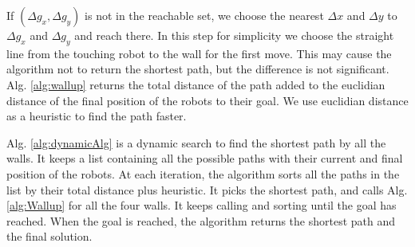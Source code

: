 If  $(\Delta g_x, \Delta g_y)$ is not in the reachable set, we choose the nearest $\Delta x$ and $\Delta y$ to $\Delta g_x$ and $\Delta g_y$ and reach there. In this step for simplicity we choose the straight line from the touching robot to the wall for the first move. This may cause the algorithm not to return the shortest path, but the difference is not significant. 
Alg. \ref{alg:wallup} returns the total distance of the path added to the euclidian distance of the final position of the robots to their goal. We use euclidian distance as a heuristic to find the path faster.

Alg. \ref{alg:dynamicAlg} is a dynamic search to find the shortest path by all the walls. It keeps a list containing all the possible paths with their current and final position of the robots. At each iteration, the algorithm sorts all the paths in the list by their total distance plus heuristic. It picks the shortest path, and calls Alg. \ref{alg:Wallup} for all the four walls. It keeps calling and sorting until the goal has reached. When the goal is reached, the algorithm returns the shortest path and the final solution.
%
%
%
%

